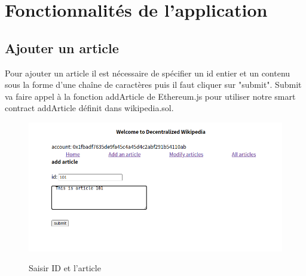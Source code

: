 \documentclass[14px]{article}
\begin{document}
	\section{Fonctionnalités de l'application}
	\subsection{Ajouter un article}
	Pour ajouter un article il est nécessaire de spécifier un id entier et un contenu sous la forme d'une chaîne de caractères puis il faut cliquer sur "submit". Submit va faire appel à la fonction addArticle de Ethereum.js pour utiliser notre smart contract addArticle définit dans wikipedia.sol.
	\begin{figure}[H]
		\begin{minipage}[H]{0.7\linewidth}
			\centering
			\includegraphics[width=\textwidth]{Add01.png}\\
			\caption{Saisir ID et l'article}
			\label{img1}
		\end{minipage}
		\begin{minipage}[H]{0.3\linewidth}
			\centering

\end{minipage}
\end{figure}
\end{document}
